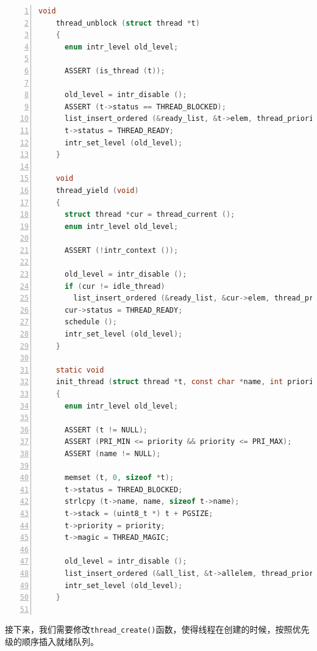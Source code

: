 \documentclass{article}
\begin{document}
\begin{lstlisting}[xleftmargin = 4em,xrightmargin = 3em, aboveskip = 1em, numbers = left, language = C, title=对相关函数的修改]
    void
    thread_unblock (struct thread *t) 
    {
      enum intr_level old_level;

      ASSERT (is_thread (t));

      old_level = intr_disable ();
      ASSERT (t->status == THREAD_BLOCKED);
      list_insert_ordered (&ready_list, &t->elem, thread_priority_cmp, NULL); // 按优先级排序
      t->status = THREAD_READY;
      intr_set_level (old_level);
    }

    void
    thread_yield (void) 
    {
      struct thread *cur = thread_current ();
      enum intr_level old_level;
      
      ASSERT (!intr_context ());

      old_level = intr_disable ();
      if (cur != idle_thread) 
        list_insert_ordered (&ready_list, &cur->elem, thread_priority_cmp, NULL); // 按优先级排序
      cur->status = THREAD_READY;
      schedule ();
      intr_set_level (old_level);
    }

    static void
    init_thread (struct thread *t, const char *name, int priority)
    {
      enum intr_level old_level;

      ASSERT (t != NULL);
      ASSERT (PRI_MIN <= priority && priority <= PRI_MAX);
      ASSERT (name != NULL);

      memset (t, 0, sizeof *t);
      t->status = THREAD_BLOCKED;
      strlcpy (t->name, name, sizeof t->name);
      t->stack = (uint8_t *) t + PGSIZE;
      t->priority = priority;
      t->magic = THREAD_MAGIC;

      old_level = intr_disable ();
      list_insert_ordered (&all_list, &t->allelem, thread_priority_cmp, NULL); // 按优先级排序
      intr_set_level (old_level);
    }
  
\end{lstlisting}


接下来，我们需要修改\texttt{thread\_create()}函数，使得线程在创建的时候，按照优先级的顺序插入就绪队列。
\end{document}
